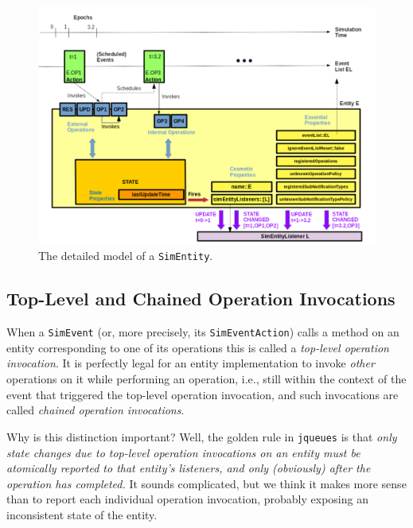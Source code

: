 \begin{figure}[h]
    \label{fig:EntityModel}
    \caption{The detailed model of a \texttt{SimEntity}.}
    \includegraphics[width=\textwidth]{fig/EntityModel}
\end{figure}

\subsection{Top-Level and Chained Operation Invocations}

When a \lstinline|SimEvent|
  (or, more precisely, its \lstinline|SimEventAction|)
  calls a method on an entity corresponding to one of its operations
  this is called a {\em top-level operation invocation}.
It is perfectly legal for an entity implementation
  to invoke {\em other\/} operations on it
  while performing an operation,
  i.e.,
  still within the context of the event that triggered
  the top-level operation invocation,
  and such invocations are called
  {\em chained operation invocations}.
  
Why is this distinction important?
Well, the golden rule in \lstinline|jqueues|
  is that
  {\em only state changes
       due to top-level operation invocations on an entity
       must be atomically reported to that entity's listeners,
       and only (obviously) after the operation has completed.}
It sounds complicated, but we think it makes more sense
  than to report each individual operation invocation,
  probably exposing an inconsistent state of the entity.

